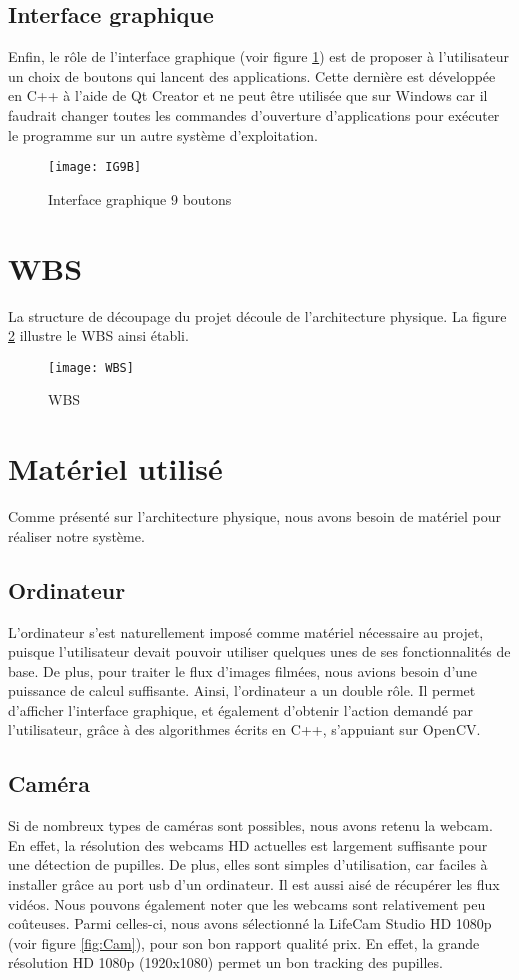 \subsection{Interface graphique}
Enfin, le rôle de l'interface graphique (voir figure \ref{fig:IG9B2}) est de proposer à l'utilisateur un choix de boutons qui lancent des applications. Cette dernière est développée en C++ à l'aide de Qt Creator et ne peut être utilisée que sur Windows car il faudrait changer toutes les commandes d'ouverture d'applications pour exécuter le programme sur un autre système d'exploitation.

\begin{figure}[H]
  \centering
  \texttt{[image: IG9B]}
  \caption{Interface graphique 9 boutons}
  \label{fig:IG9B2}
\end{figure}

\section{WBS}
La structure de découpage du projet découle de l'architecture physique. La figure \ref{fig:WBS} illustre le WBS ainsi établi. 

\begin{figure}[H]
  \centering
  \texttt{[image: WBS]}
  \caption{WBS}
  \label{fig:WBS}
\end{figure}

\section{Matériel utilisé}

Comme présenté sur l'architecture physique, nous avons besoin de matériel pour réaliser notre système.

\subsection{Ordinateur}
L'ordinateur s'est naturellement imposé comme matériel nécessaire au projet, puisque l'utilisateur devait pouvoir utiliser quelques unes de ses fonctionnalités de base. De plus, pour traiter le flux d'images filmées, nous avions besoin d'une puissance de calcul suffisante. Ainsi, l'ordinateur a un double rôle. Il permet d'afficher l'interface graphique, et également d'obtenir l'action demandé par l'utilisateur, grâce à des algorithmes écrits en C++, s'appuiant sur OpenCV. 

\subsection{Caméra}
Si de nombreux types de caméras sont possibles, nous avons retenu la webcam. En effet, la résolution des webcams HD actuelles est largement suffisante pour une détection de pupilles. De plus, elles sont simples d'utilisation, car faciles à installer grâce au port usb d'un ordinateur. Il est aussi aisé de récupérer les flux vidéos. Nous pouvons également noter que les webcams sont relativement peu coûteuses.
Parmi celles-ci, nous avons sélectionné la LifeCam Studio HD 1080p (voir figure \ref{fig:Cam}), pour son bon rapport qualité prix. En effet, la grande résolution HD 1080p (1920x1080) permet un bon tracking des pupilles.

